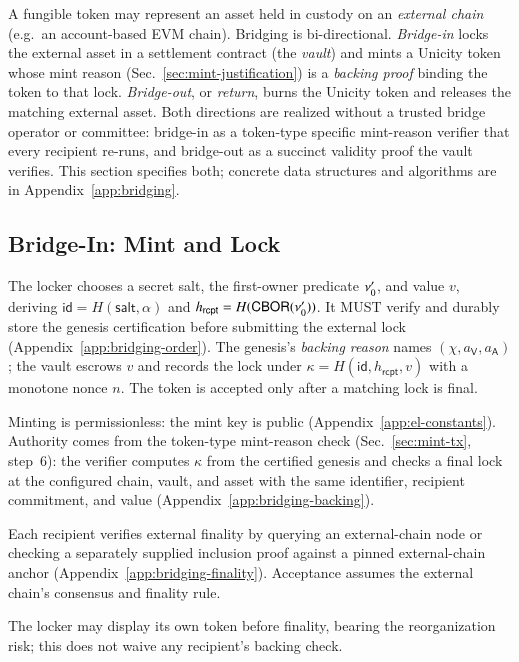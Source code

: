 A fungible token may represent an asset held in custody on an \emph{external chain} (e.g.\ an account-based EVM chain). Bridging is bi-directional. \emph{Bridge-in} locks the external asset in a settlement contract (the \emph{vault}) and mints a Unicity token whose mint reason (Sec.~\ref{sec:mint-justification}) is a \emph{backing proof} binding the token to that lock. \emph{Bridge-out}, or \emph{return}, burns the Unicity token and releases the matching external asset. Both directions are realized without a trusted bridge operator or committee: bridge-in as a token-type specific mint-reason verifier that every recipient re-runs, and bridge-out as a succinct validity proof the vault verifies. This section specifies both; concrete data structures and algorithms are in Appendix~\ref{app:bridging}.

\subsection{Bridge-In: Mint and Lock}\label{sec:bridge-in}

The locker chooses a secret salt, the first-owner predicate $\nu'_0$, and value $v$, deriving $\mathsf{id} = H(\mathsf{salt},\alpha)$ and $h_\mathsf{rcpt} = H(\mathsf{CBOR}(\nu'_0))$. It MUST verify and durably store the genesis certification before submitting the external lock (Appendix~\ref{app:bridging-order}). The genesis's \emph{backing reason} names $(\chi,a_\mathsf{V},a_\mathsf{A})$; the vault escrows $v$ and records the lock under $\kappa = H(\mathsf{id},h_\mathsf{rcpt},v)$ with a monotone nonce $n$. The token is accepted only after a matching lock is final.

Minting is permissionless: the mint key is public (Appendix~\ref{app:el-constants}). Authority comes from the token-type mint-reason check (Sec.~\ref{sec:mint-tx}, step~6): the verifier computes $\kappa$ from the certified genesis and checks a final lock at the configured chain, vault, and asset with the same identifier, recipient commitment, and value (Appendix~\ref{app:bridging-backing}).

Each recipient verifies external finality by querying an external-chain node or checking a separately supplied inclusion proof against a pinned external-chain anchor (Appendix~\ref{app:bridging-finality}). Acceptance assumes the external chain's consensus and finality rule.

The locker may display its own token before finality, bearing the reorganization risk; this does not waive any recipient's backing check.

